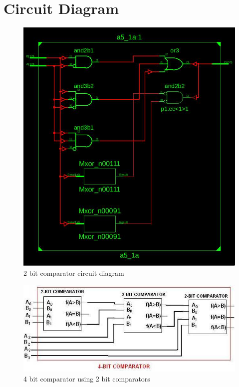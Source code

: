 \documentclass[titlepage]{article}
\begin{document}
    \section{Circuit Diagram}
    \begin{figure}[!ht]
        \centering
        \includegraphics[width=12cm]{./figures/2bit_com.jpeg}
        \caption{2 bit comparator circuit diagram}
    \end{figure}
    \begin{figure}[!ht]
        \centering
        \includegraphics[width=12cm]{./figures/4bit.jpg}
        \caption{4 bit comparator using 2 bit comparators}
    \end{figure}
\end{document}

